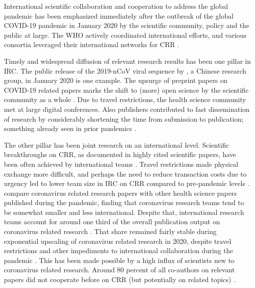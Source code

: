 International scientific collaboration and cooperation to address the global pandemic has been emphasized immediately after the outbreak of the global COVID-19 pandemic in January 2020 by the scientific community, policy and the public at large. The WHO actively coordinated international efforts, and various consortia leveraged their international networks for CRR \citep{kinsella2020preparedness}.

Timely and widespread diffusion of relevant research results has been one pillar in IRC. The public release of the 2019-nCoV viral sequence by \cite{lu2020genomic}, a Chinese research group, in January 2020 is one example. The upsurge of preprint papers on COVID-19 related papers marks the shift to (more) open science by the scientific community as a whole \citep{aviv2021publication,homolak2020preliminary}. Due to travel restrictions, the health science community met at large digital conferences. Also publishers contributed to fast dissemination of research by considerably shortening the time from submission to publication; something already seen in prior pandemics \citep{aviv2021publication,palayew2020pandemic}. 

The other pillar has been joint research on an international level. Scientific breakthroughs on CRR, as documented in highly cited scientific papers, have been often achieved by international teams \citep{aviv2021publication}. Travel restrictions made physical exchange more difficult, and perhaps the need to reduce transaction costs due to urgency led to lower team size in IRC on CRR compared to pre-pandemic levels \citep{cai2021international,fry2020consolidation,lee2020strategy}. \cite{aviv2021publication} compare coronavirus related research papers with other health science papers published during the pandemic, finding that coronavirus research teams tend to be somewhat smaller and less international. Despite that, international research teams account for around one third of the overall publication output on coronavirus related research \citep{aviv2021publication,cai2021international,lee2021scientific}. That share remained fairly stable during exponential upscaling of coronavirus related research in 2020, despite  travel restrictions and other impediments to international collaboration during the pandemic \citep{cai2021international}. This has been made possible by a high influx of scientists new to coronavirus related research. Around 80 percent of all co-authors on relevant papers did not cooperate before on CRR (but potentially on related topics) \citep{liu2021can}. 

